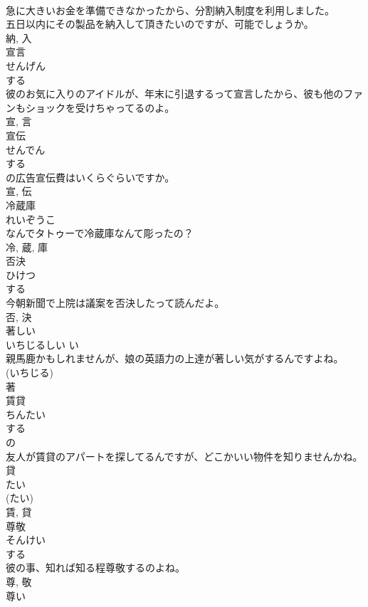 \documentclass[8pt]{extreport}
\begin{document}
\begin{CJK}{UTF8}{min}
\\	急に大きいお金を準備できなかったから、分割納入制度を利用しました。	
\\	五日以内にその製品を納入して頂きたいのですが、可能でしょうか。	
\\	納, 入	
\\	宣言	
\\	せんげん	
\\	する 
\\	彼のお気に入りのアイドルが、年末に引退するって宣言したから、彼も他のファンもショックを受けちゃってるのよ。	
\\	宣, 言	
\\	宣伝	
\\	せんでん	
\\	する 
\\	の広告宣伝費はいくらぐらいですか。	
\\	宣, 伝	
\\	冷蔵庫	
\\	れいぞうこ	
\\	なんでタトゥーで冷蔵庫なんて彫ったの？	
\\	冷, 蔵, 庫	
\\	否決	
\\	ひけつ	
\\	する 
\\	今朝新聞で上院は議案を否決したって読んだよ。	
\\	否, 決	
\\	著しい	
\\	いちじるしい	い 
\\	親馬鹿かもしれませんが、娘の英語力の上達が著しい気がするんですよね。	
\\	(いちじる) 
\\	著	
\\	賃貸	
\\	ちんたい	
\\	する 
\\	の 
\\	友人が賃貸のアパートを探してるんですが、どこかいい物件を知りませんかね。	
\\	貸 
\\	たい 
\\	(たい) 
\\	賃, 貸	
\\	尊敬	
\\	そんけい	
\\	する 
\\	彼の事、知れば知る程尊敬するのよね。	
\\	尊, 敬	
\\	尊い	

\end{CJK}
\end{document}
